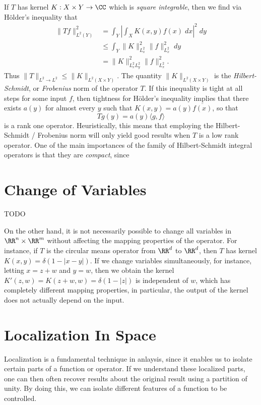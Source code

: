 If $T$ has kernel $K: X \times Y \to \CC$ which is \emph{square integrable}, then we find via H\"{o}lder's inequality that
%
\begin{align*}
    \| T f \|_{L^2(Y)}^2 &= \int_Y \left| \int_X K(x,y) f(x)\; dx \right|^2\; dy\\
    &\leq \int_Y \| K \|_{L^2_x}^2 \| f \|_{L^2_x}^2\; dy\\
    &= \| K \|_{L^2_x L^2_y}^2 \| f \|_{L^2_x}^2.
\end{align*}
%
Thus $\| T \|_{L^2 \to L^2} \leq \| K \|_{L^2(X \times Y)}$. The quantity $\| K \|_{L^2(X \times Y)}$ is the \emph{Hilbert-Schmidt}, or \emph{Frobenius} norm of the operator $T$. If this inequality is tight at all steps for some input $f$, then tightness for H\"{o}lder's inequality implies that there exists $a(y)$ for almost every $y$ such that $K(x,y) = a(y) \overline{f(x)}$, so that
%
\[ Tg(y) = a(y) \langle g, f \rangle \]
%
is a rank one operator. Heuristically, this means that employing the Hilbert-Schmidt / Frobenius norm will only yield good results when $T$ is a low rank operator. One of the main importances of the family of Hilbert-Schmidt integral operators is that they are \emph{compact}, since 




\section{Change of Variables}

TODO

On the other hand, it is not necessarily possible to change all variables in $\RR^n \times \RR^m$ without affecting the mapping properties of the operator. For instance, if $T$ is the circular means operator from $\RR^d$ to $\RR^d$, then $T$ has kernel $K(x,y) = \delta(1 - |x - y|)$. If we change variables simultaneously, for instance, letting $x = z + w$ and $y = w$, then we obtain the kernel $K'(z,w) = K(z + w, w) = \delta(1 - |z|)$ is independent of $w$, which has completely different mapping properties, in particular, the output of the kernel does not actually depend on the input.








\section{Localization In Space}

Localization is a fundamental technique in anlaysis, since it enables us to isolate certain parts of a function or operator. If we understand these localized parts, one can then often recover results about the original result using a partition of unity. By doing this, we can isolate different features of a function to be controlled.

